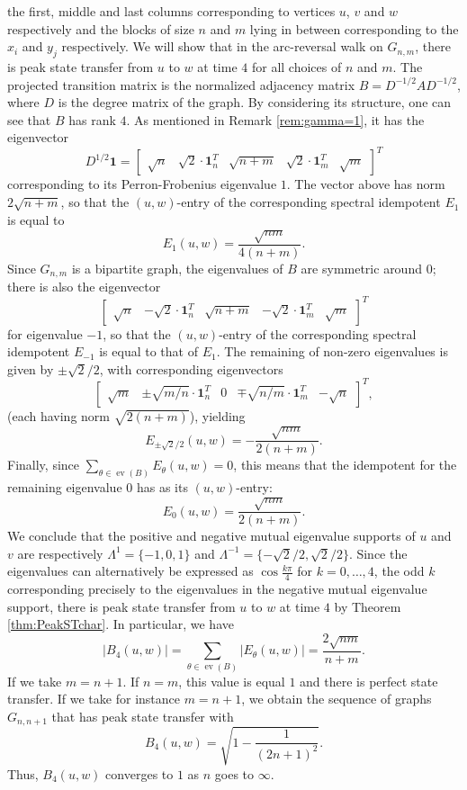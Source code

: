 \documentclass{article}
\numberwithin{equation}{section}
\DeclareMathOperator\ev{ev}
\newcommand\ones{{\mathbf 1}}
\begin{document}
the first, middle and last columns corresponding to vertices $u$, $v$ and $w$ respectively and the blocks of size $n$ and $m$ lying in between corresponding to the $x_i$ and $y_j$ respectively. We will show that in the arc-reversal walk on $G_{n,m}$, there is peak state transfer from $u$ to $w$ at time $4$ for all choices of $n$ and $m$. The projected transition matrix is the normalized adjacency matrix $B = D^{-1/2} A D^{-1/2}$, where $D$ is the degree matrix of the graph. By considering its structure, one can see that $B$ has rank $4$. As mentioned in Remark \ref{rem:gamma=1}, it has the eigenvector
\[
D^{1/2}\ones = \begin{bmatrix}\sqrt{n} & \sqrt{2}\cdot\ones_n^T & \sqrt{n+m} & \sqrt{2}\cdot\ones_m^T & \sqrt{m}\end{bmatrix}^T
\]
corresponding to its Perron-Frobenius eigenvalue $1$. The vector above has norm $2\sqrt{n+m}$, so that the $(u,w)$-entry of the corresponding spectral idempotent $E_1$ is equal to
\[
E_1(u,w) = \frac{\sqrt{nm}}{4(n + m)}.
\]
Since $G_{n,m}$ is a bipartite graph, the eigenvalues of $B$ are symmetric around $0$; there is also the eigenvector
\[
\begin{bmatrix}\sqrt{n} & -\sqrt{2}\cdot\ones_n^T & \sqrt{n+m} & -\sqrt{2}\cdot\ones_m^T & \sqrt{m}\end{bmatrix}^T
\]
for eigenvalue $-1$, so that the $(u,w)$-entry of the corresponding spectral idempotent $E_{-1}$ is equal to that of $E_1$. The remaining of non-zero eigenvalues is given by $\pm \sqrt{2}/2$, with corresponding eigenvectors
\[
\begin{bmatrix}\sqrt{m} & \pm\sqrt{m/n}\cdot\ones_n^T & 0 & \mp\sqrt{n/m}\cdot\ones_m^T & -\sqrt{n}\end{bmatrix}^T,
\]
(each having norm $\sqrt{2(n+m)}$), yielding
\[
E_{\pm \sqrt{2}/2}(u,w) = -\frac{\sqrt{nm}}{2(n+m)}.
\]
Finally, since $\sum_{\theta \in \ev(B)} E_{\theta}(u,w) = 0$, this means that the idempotent for the remaining eigenvalue $0$ has as its $(u,w)$-entry:
\[
E_0(u,w) = \frac{\sqrt{nm}}{2(n+m)}.
\]
We conclude that the positive and negative mutual eigenvalue supports of $u$ and $v$ are respectively $\Lambda^1 = \{-1,0,1\}$ and $\Lambda^{-1} = \{-\sqrt{2}/2,\sqrt{2}/2\}$. Since the eigenvalues can alternatively be expressed as $\cos\frac{k\pi}{4}$ for $k = 0,\ldots,4$, the odd $k$ corresponding precisely to the eigenvalues in the negative mutual eigenvalue support, there is peak state transfer from $u$ to $w$ at time $4$ by Theorem \ref{thm:PeakSTchar}. In particular, we have
\[
|B_4(u,w)| = \sum_{\theta \in \ev(B)} |E_\theta(u,w)| = \frac{2\sqrt{nm}}{n+m}.
\]
If we take $m = n+1$. If $n = m$, this value is equal $1$ and there is perfect state transfer. If we take for instance $m = n+1$, we obtain the sequence of graphs $G_{n,n+1}$ that has peak state transfer with
\[
B_4(u,w) = \sqrt{1 - \frac{1}{(2n+1)^2}}.
\]
Thus, $B_4(u,w)$ converges to $1$ as $n$ goes to $\infty$.
\end{document}
